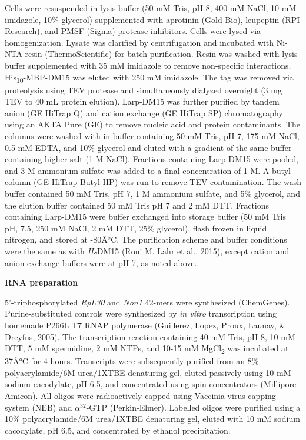 \documentclass[12pt,oneside]{reedthesis}
\begin{document}
Cells were resuspended in lysis buffer (50 mM Tris, pH 8, 400 mM NaCl,
10 mM imidazole, 10\% glycerol) supplemented with aprotinin (Gold Bio),
leupeptin (RPI Research), and PMSF (Sigma) protease inhibitors. Cells
were lysed via homogenization. Lysate was clarified by centrifugation
and incubated with Ni-NTA resin (ThermoScientific) for batch
purification. Resin was washed with lysis buffer supplemented with 35 mM
imidazole to remove non-specific interactions. His\textsubscript{10}-MBP-DM15 was
eluted with 250 mM imidazole. The tag was removed via proteolysis using
TEV protease and simultaneously dialyzed overnight (3 mg TEV to 40 mL
protein elution). Larp-DM15 was further purified by tandem anion (GE
HiTrap Q) and cation exchange (GE HiTrap SP) chromatography using an
AKTA Pure (GE) to remove nucleic acid and protein contaminants. The
columns were washed with in buffer containing 50 mM Tris, pH 7, 175 mM
NaCl, 0.5 mM EDTA, and 10\% glycerol and eluted with a gradient of the
same buffer containing higher salt (1 M NaCl). Fractions containing
Larp-DM15 were pooled, and 3 M ammonium sulfate was added to a final
concentration of 1 M. A butyl column (GE HiTrap Butyl HP) was run to
remove TEV contamination. The wash buffer contained 50 mM Tris, pH 7, 1
M ammonium sulfate, and 5\% glycerol, and the elution buffer contained 50
mM Tris pH 7 and 2 mM DTT. Fractions containing Larp-DM15 were buffer
exchanged into storage buffer (50 mM Tris pH, 7.5, 250 mM NaCl, 2 mM
DTT, 25\% glycerol), flash frozen in liquid nitrogen, and stored at
-80Â°C. The purification scheme and buffer conditions were the same as
with \emph{Hs}DM15 (Roni M. Lahr et al., 2015), except cation and
anion exchange buffers were at pH 7, as noted above.

\textbf{RNA preparation}

5'-triphosphorylated \emph{RpL30} and \emph{Non1} 42-mers were synthesized
(ChemGenes). Purine-substituted controls were synthesized by \emph{in vitro}
transcription using homemade P266L T7 RNAP polymerase
(Guillerez, Lopez, Proux, Launay, \& Dreyfus, 2005). The transcription reaction containing
40 mM Tris, pH 8, 10 mM DTT, 5 mM spermidine, 2 mM NTPs, and 10-15 mM
MgCl\textsubscript{2} was incubated at 37Â°C for 4 hours. Transcripts were subsequently
purified from an 8\% polyacrylamide/6M urea/1XTBE denaturing gel, eluted
passively using 10 mM sodium cacodylate, pH 6.5, and concentrated using
spin concentrators (Millipore Amicon). All oligos were radioactively
capped using Vaccinia virus capping system (NEB) and \(\alpha^{32}\)-GTP
(Perkin-Elmer). Labelled oligos were purified using a 10\%
polyacrylamide/6M urea/1XTBE denaturing gel, eluted with 10 mM sodium
cacodylate, pH 6.5, and concentrated by ethanol precipitation.
\end{document}
